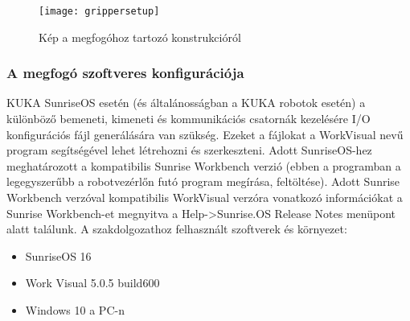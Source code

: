 \documentclass[../documentation.tex]{subfiles}
\begin{document}
\begin{figure}
\centering
\texttt{[image: grippersetup]}
\caption{Kép a megfogóhoz tartozó konstrukcióról}
\label{fig:grippersetup}
\end{figure}

\subsubsection{A megfogó szoftveres konfigurációja}
KUKA SunriseOS esetén (és általánosságban a KUKA robotok esetén) a különböző bemeneti, kimeneti és kommunikációs csatornák kezelésére I/O konfigurációs fájl generálására van szükség. Ezeket a fájlokat a WorkVisual nevű program segítségével lehet létrehozni és szerkeszteni. Adott SunriseOS-hez meghatározott a kompatibilis Sunrise Workbench verzió (ebben a programban a legegyszerűbb a robotvezérlőn futó program megírása, feltöltése). Adott Sunrise Workbench verzóval kompatibilis WorkVisual verzóra vonatkozó információkat a Sunrise Workbench-et megnyitva a Help->Sunrise.OS Release Notes menüpont alatt találunk. A szakdolgozathoz felhasznált szoftverek és környezet:
\begin{itemize}
	\item SunriseOS 16
	\item Work Visual 5.0.5 build600
	\item Windows 10 a PC-n
\end{itemize}
\end{document}

